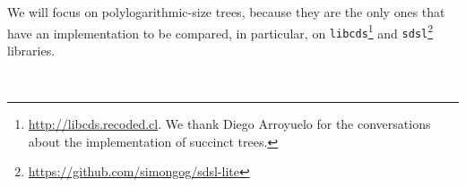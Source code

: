 We will focus on polylogarithmic-size trees, because they are the only ones that have an implementation to be compared, in particular, on {\tt libcds}\footnote{\url{http://libcds.recoded.cl}. We thank Diego Arroyuelo for the conversations about the implementation of succinct trees.} and {\tt sdsl}\footnote{\url{https://github.com/simongog/sdsl-lite}} libraries.

\\
